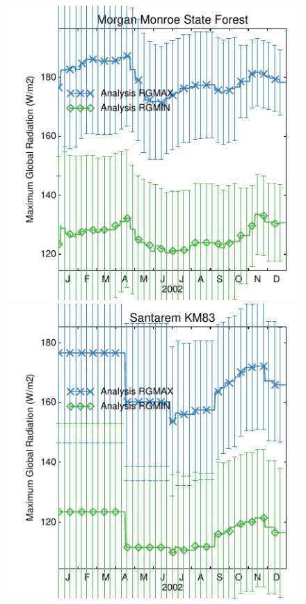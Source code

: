 \documentclass[a4paper,12pt]{article}
\begin{document}
\begin{figure}[hp]
\begin{center}
\includegraphics[scale=0.5]{Morgan_Monroe_State_Forest.dayplot.2002.RGMAX.MODIS.pdf}
\includegraphics[scale=0.5]{Santarem_KM83.dayplot.2002.RGMAX.MODIS.pdf}

\end{center}
\end{figure}
\end{document}
